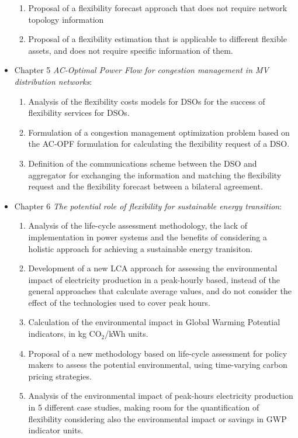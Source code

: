 \begin{itemize}
\begin{enumerate}
		\item Proposal of a flexibility forecast approach that does not require network topology information
		\item Proposal of a flexibility estimation that is applicable to different flexible assets, and does not require specific information of them. 
	\end{enumerate}
\item Chapter 5 \textit{AC-Optimal Power Flow for congestion management in MV distribution networks}: 
	\begin{enumerate}
		\item Analysis of the flexibility costs models for DSOs for the success of flexibility services for DSOs. 
		\item Formulation of a congestion management optimization problem based on the AC-OPF formulation for calculating the flexibility request of a DSO.
		\item Definition of the communications scheme between the DSO and aggregator for exchanging the information and matching the flexibility request and the flexibility forecast between a bilateral agreement.
	\end{enumerate}
\item Chapter 6 \textit{The potential role of flexibility for sustainable energy transition}: 
	\begin{enumerate}
		\item Analysis of the life-cycle assessment methodology, the lack of implementation in power systems and the benefits of considering a holistic approach for achieving a sustainable energy tranisiton. 
		\item Development of a new LCA approach for assessing the environmental impact of electricity production in a peak-hourly based, instead of the general approaches that calculate average values, and do not consider the effect of the technologies used to cover peak hours. 
		\item Calculation of the environmental impact in Global Warming Potential indicators, in kg CO$_2$/kWh units. 
		\item Proposal of a new methodology based on life-cycle assessment for policy makers to assess the potential environmental, using time-varying carbon pricing strategies. 
		\item Analysis of the environmental impact of peak-hours electricity production in 5 different case studies, making room for the quantification of flexibility considering also the environmental impact or savings in GWP indicator units. 
	\end{enumerate}
\end{itemize}
	


